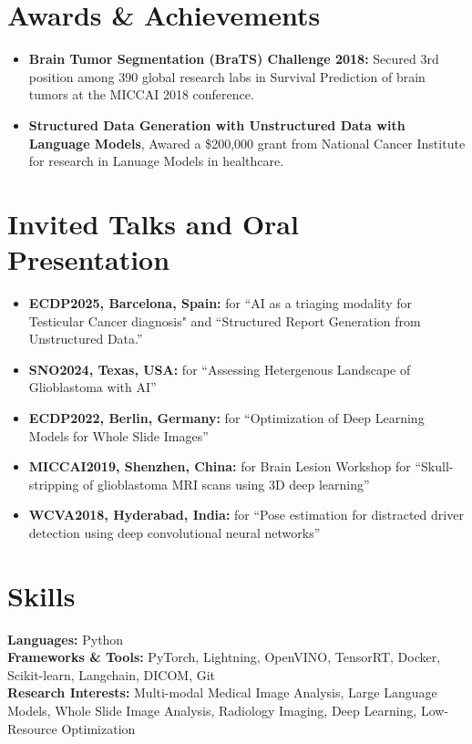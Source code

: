 \documentclass[letterpaper,11pt]{article}
\newcommand{\resumeItem}[1]{
  \item\small{
    {#1 \vspace{-2pt}}
  }
}
\newcommand{\resumeSubHeadingListStart}{\begin{itemize}[leftmargin=0.15in, label={}]}
\newcommand{\resumeSubHeadingListEnd}{\end{itemize}}
\begin{document}
\section{Awards \& Achievements}
  \vspace{2pt}
  \resumeSubHeadingListStart
    \resumeItem{\textbf{Brain Tumor Segmentation (BraTS) Challenge 2018:} Secured 3rd position among 390 global research labs in Survival Prediction of brain tumors at the MICCAI 2018 conference.}
    \resumeItem{\textbf{Structured Data Generation with Unstructured Data with Language Models}, Awared a \$200,000 grant from National Cancer Institute for research in Lanuage Models in healthcare. }
  \resumeSubHeadingListEnd

\section{Invited Talks and Oral Presentation}
  \vspace{2pt}
  \resumeSubHeadingListStart
    \resumeItem{\textbf{ECDP2025, Barcelona, Spain:} for ``AI as a triaging modality for Testicular Cancer diagnosis" and ``Structured Report Generation from Unstructured Data.''}
    \resumeItem{\textbf{SNO2024, Texas, USA:} for ``Assessing Hetergenous Landscape of Glioblastoma with AI''}
    \resumeItem{\textbf{ECDP2022, Berlin, Germany:} for ``Optimization of Deep Learning Models for Whole Slide Images''}
    \resumeItem{\textbf{MICCAI2019, Shenzhen, China:} for Brain Lesion Workshop for ``Skull-stripping of glioblastoma MRI scans using 3D deep learning''}
    \resumeItem{\textbf{WCVA2018, Hyderabad, India:} for ``Pose estimation for distracted driver detection using deep convolutional neural networks''}
  \resumeSubHeadingListEnd


\section{Skills}
  \vspace{2pt}
  \resumeSubHeadingListStart
    \small{\item{
        \textbf{Languages:}{ Python} \\ \vspace{3pt}
        \textbf{Frameworks \& Tools:}{ PyTorch, Lightning, OpenVINO, TensorRT, Docker, Scikit-learn, Langchain, DICOM, Git} \\ \vspace{3pt}
        \textbf{Research Interests:}{ Multi-modal Medical Image Analysis, Large Language Models, Whole Slide Image Analysis, Radiology Imaging, Deep Learning, Low-Resource Optimization} \\ \vspace{3pt}
    }}
  \resumeSubHeadingListEnd
\end{document}
